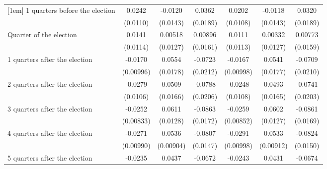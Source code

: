 \begin{table}[htbp]
\begin{tabular}{l*{6}{c}}
[1em]
 1 quarters before the election&      0.0242\sym{*}  &     -0.0120         &      0.0362         &      0.0202         &     -0.0118         &      0.0320         \\
                    &    (0.0110)         &    (0.0143)         &    (0.0189)         &    (0.0108)         &    (0.0143)         &    (0.0189)         \\
[1em]
Quarter of the election&      0.0141         &     0.00518         &     0.00896         &      0.0111         &     0.00332         &     0.00773         \\
                    &    (0.0114)         &    (0.0127)         &    (0.0161)         &    (0.0113)         &    (0.0127)         &    (0.0159)         \\
[1em]
 1 quarters after the election&     -0.0170         &      0.0554\sym{**} &     -0.0723\sym{***}&     -0.0167         &      0.0541\sym{**} &     -0.0709\sym{***}\\
                    &   (0.00996)         &    (0.0178)         &    (0.0212)         &   (0.00998)         &    (0.0177)         &    (0.0210)         \\
[1em]
 2 quarters after the election&     -0.0279\sym{**} &      0.0509\sym{**} &     -0.0788\sym{***}&     -0.0248\sym{*}  &      0.0493\sym{**} &     -0.0741\sym{***}\\
                    &    (0.0106)         &    (0.0166)         &    (0.0206)         &    (0.0108)         &    (0.0165)         &    (0.0203)         \\
[1em]
 3 quarters after the election&     -0.0252\sym{**} &      0.0611\sym{***}&     -0.0863\sym{***}&     -0.0259\sym{**} &      0.0602\sym{***}&     -0.0861\sym{***}\\
                    &   (0.00833)         &    (0.0128)         &    (0.0172)         &   (0.00852)         &    (0.0127)         &    (0.0169)         \\
[1em]
 4 quarters after the election&     -0.0271\sym{**} &      0.0536\sym{***}&     -0.0807\sym{***}&     -0.0291\sym{**} &      0.0533\sym{***}&     -0.0824\sym{***}\\
                    &   (0.00990)         &   (0.00904)         &    (0.0147)         &   (0.00998)         &   (0.00912)         &    (0.0150)         \\
[1em]
 5 quarters after the election&     -0.0235\sym{*}  &      0.0437\sym{**} &     -0.0672\sym{***}&     -0.0243\sym{*}  &      0.0431\sym{**} &     -0.0674\sym{***}\\

\end{tabular}
\end{table}
